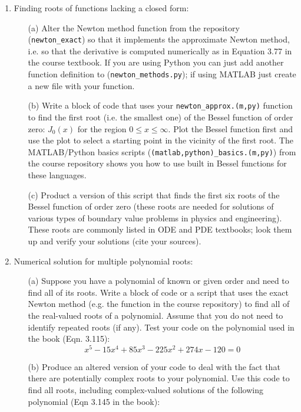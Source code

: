 \documentclass{article}
\begin{document}
\pagebreak

\begin{enumerate}
  \item Finding roots of functions lacking a closed form:  
  \begin{itemize}
    \item[(a)]  Alter the Newton method function from the repository (\texttt{newton\_exact}) so that it implements the approximate Newton method, i.e. so that the derivative is computed numerically as in Equation 3.77 in the course textbook.  If you are using Python you can just add another function definition to (\texttt{newton\_methods.py}); if using MATLAB just create a new file with your function.  
    \item[(b)]  Write a block of code that uses your \texttt{newton\_approx.(m,py)} function to find the first root (i.e. the smallest one) of the Bessel function of order zero: $J_0(x)$ for the region $0 \le x \le \infty$.  Plot the Bessel function first and use the plot to select a starting point in the vicinity of the first root.  The MATLAB/Python basics scripts (\texttt{(matlab,python)\_basics.(m,py)}) from the course repository shows you how to use built in Bessel functions for these languages.   
    \item[(c)]  Product a version of this script that finds the first six roots of the Bessel function of order zero (these roots are needed for solutions of various types of boundary value problems in physics and engineering).  These roots are commonly listed in ODE and PDE textbooks; look them up and verify your solutions (cite your sources).  
  \end{itemize} 
  \item Numerical solution for multiple polynomial roots:
  \begin{itemize}
    \item[(a)]  Suppose you have a polynomial of known or given order and need to find all of its roots.  Write a block of code or a script that uses the exact Newton method (e.g. the function in the course repository) to find all of the real-valued roots of a polynomial.  Assume that you do not need to identify repeated roots (if any).  Test your code on the polynomial used in the book (Eqn. 3.115):
    \begin{equation}
      x^5-15x^4+85x^3-225x^2+274x-120=0 \label{eqn:highpoly}
    \end{equation}
    \item[(b)]  Produce an altered version of your code to deal with the fact that there are potentially complex roots to your polynomial.  Use this code to find all roots, including complex-valued solutions of the following polynomial (Eqn 3.145 in the book):

\end{itemize}
\end{enumerate}
\end{document}
